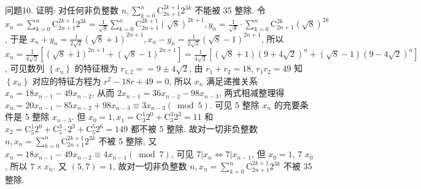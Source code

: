 问题10. 证明: 对任何非负整数 $n, \sum_{k=0}^n \mathrm{C}_{2 n+1}^{2 k+1} 2^{3 k}$ 不能被 35 整除.
令 $x_n=\sum_{k=0}^n \mathrm{C}_{2 n+1}^{2 k+1} 2^{3 k}=\frac{1}{\sqrt{8}} \sum_{k=0}^n \mathrm{C}_{2 n+1}^{2 k+1}(\sqrt{8})^{2 k+1}, y_n=\frac{1}{\sqrt{8}} \cdot \sum_{k=0}^n \mathrm{C}_{2 n+1}^{2 k}(\sqrt{8})^{2 k}$, 于是 $x_n+y_n=\frac{1}{2 \sqrt{2}}(\sqrt{8}+1)^{2 n+1}, x_n-y_n=\frac{1}{2 \sqrt{2}}(\sqrt{8}-1)^{2 n+1}$, 所以 $x_n= \frac{1}{4 \sqrt{2}}\left[(\sqrt{8}+1)^{2 n+1}+(\sqrt{8}-1)^{2 n+1}\right]=\frac{1}{4 \sqrt{2}}\left[(\sqrt{8}+1)(9+4 \sqrt{2})^n+(\sqrt{8}-1)\right. \left.(9-4 \sqrt{2})^n\right]$, 可见数列 $\left\{x_n\right\}$ 的特征根为 $r_{1,2}==9 \pm 4 \sqrt{2}$, 由 $r_1+r_2=18$, $r_1 r_2=49$ 知 $\left\{x_n\right\}$ 对应的特征方程为 $r^2-18 r+49=0$, 所以 $x_n$ 满足递推关系 $x_n=18 x_{n-1}-49 x_{n-2}$, 从而 $2 x_{n-1}=36 x_{n-2}-98 x_{n-3}$, 两式相减整理得 $x_n= 20 x_{n-1}-85 x_{n-2}+98 x_{n-3} \equiv 3 x_{n-3}(\bmod 5)$. 可见 5 整除 $x_n$ 的充要条件是 5 整除 $x_{n-3}$. 但 $x_0=1, x_1=\mathrm{C}_3^1 2^0+\mathrm{C}_3^3 2^3=11$ 和 $x_2=\mathrm{C}_5^1 2^0+\mathrm{C}_5^3 \cdot 2^3+\mathrm{C}_5^5 2^6=149$ 都不被 5 整除.
故对一切非负整数 $n, x_n=\sum_{k=0}^n \mathrm{C}_{2 n+1}^{2 k+1} 2^{3 k}$ 不被 5 整除, 又 $x_n= 18 x_{n-1}-49 x_{n-2} \equiv 4 x_{n-1}(\bmod 7)$, 可见 $7\left|x_n \Leftrightarrow 7\right| x_{n-1}$, 但 $x_0=1$, 7 $x_0$, 所以 $7 \times x_n$. 又 $(5,7)=1$, 故对一切非负整数 $n, x_n=\sum_{k=0}^n \mathrm{C}_{2 n+1}^{2 k+1} 2^{3 k}$ 不被 35 整除.


